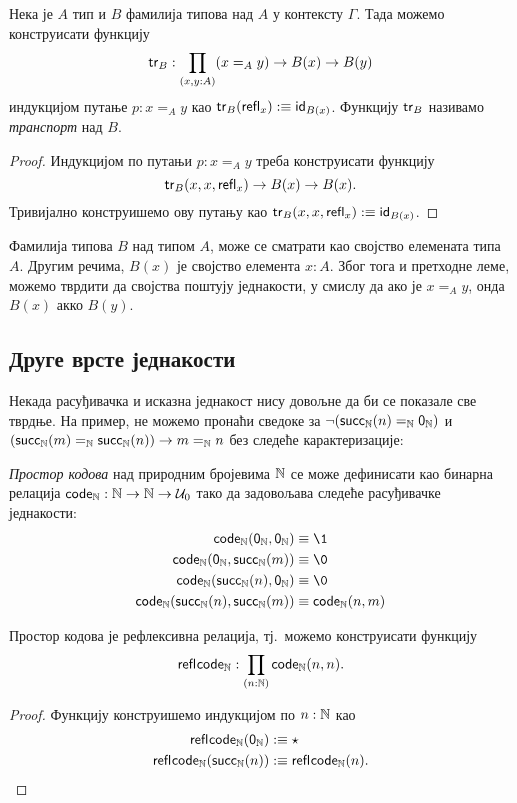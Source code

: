 \documentclass[12pt,oneside]{memoir}
\begin{document}
\begin{lemma}
    \label{lmm:tr}
    Нека је $A$ тип и $B$ фамилија типова над $A$ у контексту $\Gamma$. Тада можемо конструисати функцију
    \[\mathsf{tr}_{B} : \prod_{(x,y:A)} (x =_{A} y) \to B(x) \to B(y)\]
    индукцијом путање $p : x =_{A} y$ као $\mathsf{tr}_{B}(\mathsf{refl}_{x}) :\equiv \mathsf{id}_{B(x)}$.
Функцију $\mathsf{tr}_{B}$ називамо \emph{транспорт} над $B$.
\end{lemma}
\begin{proof}
    Индукцијом по путањи $p : x =_{A} y$ треба конструисати функцију
    \[\mathsf{tr}_{B}(x, x, \mathsf{refl}_{x}) \to B(x) \to B(x).\]
    Тривијално конструишемо ову путању као $\mathsf{tr}_{B} (x, x, \mathsf{refl}_{x}) :\equiv \mathsf{id}_{B(x)}$.
\end{proof}

Фамилија типова $B$ над типом $A$, може се сматрати као својство елемената типа $A$. Другим речима, $B(x)$ је својство елемента $x : A$. Због тога и претходне леме, можемо тврдити да својства поштују једнакости, у смислу да ако је $x =_A y$, онда $B(x)$ акко $B(y)$.

\subsection{Друге врсте једнакости}

Некада расуђивачка и исказна једнакост нису довољне да би се показале све тврдње. На пример, не можемо пронаћи сведоке за $\neg (\mathsf{succ}_\mathbb{N}(n) =_{\mathbb{N}} \mathsf{0}_\mathbb{N})$ и $(\mathsf{succ}_\mathbb{N}(m) =_{\mathbb{N}} \mathsf{succ}_\mathbb{N}(n)) \to m =_{\mathbb{N}} n$ без следеће карактеризације:

\begin{definition}
    \label{def:code}
    \emph{Простор кодова} над природним бројевима ${\mathbb{N}}$ се може дефинисати као бинарна релација $\mathsf{code}_{{\mathbb{N}}} : {\mathbb{N}} \to {\mathbb{N}} \to \mathcal{U}_0$ тако да задовољава следеће расуђивачке једнакости:
    \begin{align*}
        \codee{\N} (\zeroN, \zeroN) &\equiv\1 \\
        \codee{\N} (\zeroN, \succN(m)) &\equiv\0 \\
        \codee{\N} (\succN(n), \zeroN) &\equiv\0 \\
        \codee{\N} (\succN(n), \succN(m)) &\equiv\codee{\N} (n, m) \\
    \end{align*}
\end{definition}

\begin{lemma}
    \label{lmm:reflcode}
    Простор кодова је рефлексивна релација, тј.~можемо конструисати функцију
    \[\mathsf{refl}_{}\mathsf{code}_{{\mathbb{N}}} : \prod_{(n : {\mathbb{N}})} \mathsf{code}_{{\mathbb{N}}} (n, n).\]
\end{lemma}
\begin{proof}
    Функцију конструишемо индукцијом по $n : {\mathbb{N}}$ као
    \begin{align*}
        \mathsf{refl}_{}\mathsf{code}_{{\mathbb{N}}} (\mathsf{0}_\mathbb{N}) &:\equiv \star \\
        \mathsf{refl}_{}\mathsf{code}_{{\mathbb{N}}} (\mathsf{succ}_\mathbb{N}(n)) &:\equiv \mathsf{refl}_{}\mathsf{code}_{{\mathbb{N}}} (n).
    \end{align*}
\end{proof}
\end{document}
